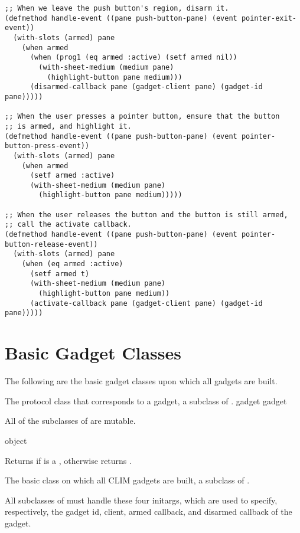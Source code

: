 \begin{verbatim}
;; When we leave the push button's region, disarm it.
(defmethod handle-event ((pane push-button-pane) (event pointer-exit-event))
  (with-slots (armed) pane
    (when armed
      (when (prog1 (eq armed :active) (setf armed nil))
        (with-sheet-medium (medium pane)
          (highlight-button pane medium)))
      (disarmed-callback pane (gadget-client pane) (gadget-id pane)))))

;; When the user presses a pointer button, ensure that the button
;; is armed, and highlight it.
(defmethod handle-event ((pane push-button-pane) (event pointer-button-press-event))
  (with-slots (armed) pane
    (when armed
      (setf armed :active)
      (with-sheet-medium (medium pane)
        (highlight-button pane medium)))))

;; When the user releases the button and the button is still armed,
;; call the activate callback.
(defmethod handle-event ((pane push-button-pane) (event pointer-button-release-event))
  (with-slots (armed) pane
    (when (eq armed :active)
      (setf armed t)
      (with-sheet-medium (medium pane)
        (highlight-button pane medium))
      (activate-callback pane (gadget-client pane) (gadget-id pane)))))
\end{verbatim}


\section {Basic Gadget Classes}

The following are the basic gadget classes upon which all gadgets are built.


The protocol class that corresponds to a gadget, a subclass of .
 {gadget} {gadget}

All of the subclasses of  are mutable.

 {object}

Returns  if  is a , otherwise returns
.


The basic class on which all CLIM gadgets are built, a subclass of .
\AbstractClass


All subclasses of  must handle these four initargs, which are used to
specify, respectively, the gadget id, client, armed callback, and disarmed
callback of the gadget.

